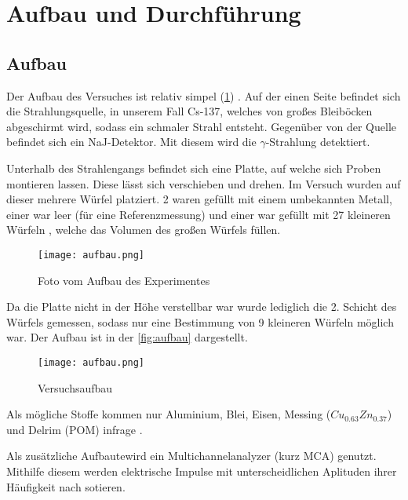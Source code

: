 \section{Aufbau und Durchführung}

\subsection{Aufbau}
Der Aufbau des Versuches ist relativ simpel (\ref{fig:1}) . Auf der einen Seite befindet sich die Strahlungsquelle, in unserem
Fall Cs-137, welches von großes Bleiböcken abgeschirmt wird, sodass ein schmaler Strahl entsteht. Gegenüber 
von der Quelle befindet sich ein NaJ-Detektor. Mit diesem wird die $\gamma$-Strahlung detektiert. 

\noindent
Unterhalb des Strahlengangs befindet sich eine Platte, auf welche sich Proben montieren lassen. Diese lässt 
sich verschieben und drehen. Im Versuch wurden auf dieser mehrere Würfel platziert. 2 waren gefüllt mit einem
umbekannten Metall, einer war leer (für eine Referenzmessung) und einer war gefüllt mit 27 kleineren Würfeln
, welche das Volumen des großen Würfels füllen.

\begin{figure}[H]
	\centering
	\texttt{[image: aufbau.png]}
	\caption{Foto vom Aufbau des Experimentes \biber}
	\label{fig:1}
\end{figure}

\noindent
Da die Platte nicht in der Höhe verstellbar war wurde lediglich die 2. Schicht des Würfels gemessen, sodass nur eine Bestimmung von 9 kleineren Würfeln möglich war. Der Aufbau ist
in der \autoref{fig:aufbau} dargestellt.

\begin{figure}
    \centering
    \texttt{[image: aufbau.png]}
    \caption{Versuchsaufbau \cite{V14}}
    \label{fig:aufbau}
  \end{figure}

\noindent
Als mögliche Stoffe kommen nur Aluminium, Blei, Eisen, Messing ($Cu_{0.63}Zn_{0.37}$) und Delrim (POM) infrage \cite{V14}. 

\noindent
Als zusätzliche Aufbautewird  ein Multichannelanalyzer (kurz MCA) genutzt. Mithilfe diesem werden elektrische Impulse mit unterscheidlichen Aplituden ihrer Häufigkeit nach sotieren. 

